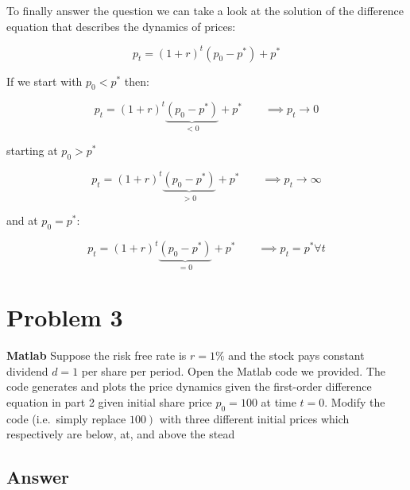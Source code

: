 \documentclass[10pt,notitlepage,onecolumn,aps,pra]{revtex4-1}
\begin{document}
    To finally answer the question we can take a look at the solution of the
difference equation that describes the dynamics of prices:

\[p_t = (1+r)^t \left(  p_0 - p^* \right) + p^*\]

If we start with \(p_0<p^*\) then:

\[p_t = (1+r)^t  \underbrace{ \left(p_0 - p^*  \right)}_{<0} + p^* \qquad \implies p_t \to 0\]

starting at \(p_0>p^*\)

\[p_t = (1+r)^t  \underbrace{ \left(p_0 - p^*  \right)}_{>0} + p^* \qquad \implies p_t \to \infty\]

and at \(p_0 = p^*\):

\[p_t = (1+r)^t  \underbrace{ \left(p_0 - p^*  \right)}_{=0} + p^* \qquad \implies p_t = p^* \forall t\]

    \hypertarget{problem-3}{%
\section{Problem 3}\label{problem-3}}

\textbf{Matlab} Suppose the risk free rate is \(r=1 \%\) and the stock
pays constant dividend \(d=1\) per share per period. Open the Matlab
code we provided. The code generates and plots the price dynamics given
the first-order difference equation in part 2 given initial share price
\(p_{0}=100\) at time \(t=0 .\) Modify the code (i.e.~simply replace
\(\left.100\right)\) with three different initial prices which
respectively are below, at, and above the stead

    \hypertarget{answer}{%
\subsection{Answer}\label{answer}}
\end{document}
